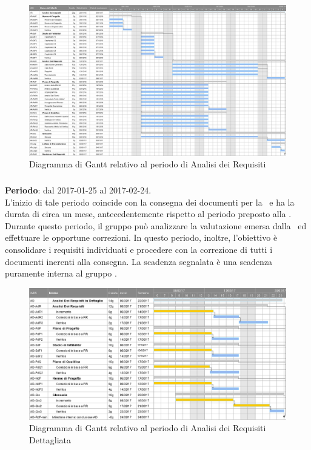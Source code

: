 		\begin{figure}[ht]
			\centering
			\includegraphics[angle=90,scale=0.37]{img/ganttnetbreak1.png}
			\caption{Diagramma di Gantt relativo al periodo di Analisi dei Requisiti}
		\end{figure}
		\FloatBarrier
		
		\subsubsection{\ARD}
		\textbf{Periodo}: dal 2017-01-25 al 2017-02-24.\\
		L'inizio di tale periodo coincide con la consegna dei documenti per la \RR\ e ha la durata di circa un mese, antecedentemente rispetto al periodo preposto alla \PA. Durante questo periodo, il gruppo può analizzare la valutazione emersa dalla \RR\ ed effettuare le opportune correzioni. In questo periodo, inoltre, l'obiettivo è consolidare i requisiti individuati e procedere con la correzione di tutti i documenti inerenti alla consegna. La scadenza segnalata è una scadenza puramente interna al gruppo \textit{\gruppo}.
		
		\begin{figure}[ht]
			\centering
			\includegraphics[scale=0.44]{img/ganttnetbreak2.png}
			\caption{Diagramma di Gantt relativo al periodo di Analisi dei Requisiti Dettagliata}
		\end{figure}
		\FloatBarrier
		
